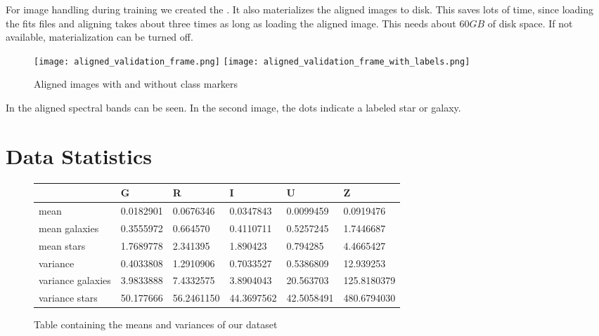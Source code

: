 For image handling during training we created the . It also materializes the aligned images to disk. This saves lots of time, since loading the fits files and aligning takes about three times as long as loading the aligned image. This needs about $60GB$ of disk space. If not available, materialization can be turned off.

\begin{figure}
    \texttt{[image: aligned\_validation\_frame.png]}
    \texttt{[image: aligned\_validation\_frame\_with\_labels.png]}
    \caption{Aligned images with and without class markers}
    \label{alignedImages}
\end{figure}

In  the aligned spectral bands can be seen. In the second image, the dots indicate a labeled star or galaxy.

\section{Data Statistics}
\begin{figure}
    \begin{table}[H]
        \begin{tabularx}{\textwidth}{mmmmmm}
            \hline
                              & G         & R          & I          & U          & Z           \\
            \hline
            mean              & 0.0182901 & 0.0676346  & 0.0347843  & 0.0099459  & 0.0919476   \\
            \hline
            mean galaxies     & 0.3555972 & 0.664570   & 0.4110711  & 0.5257245  & 1.7446687   \\
            \hline
            mean stars        & 1.7689778 & 2.341395   & 1.890423   & 0.794285   & 4.4665427   \\
            \hline
            variance          & 0.4033808 & 1.2910906  & 0.7033527  & 0.5386809  & 12.939253   \\
            \hline
            variance galaxies & 3.9833888 & 7.4332575  & 3.8904043  & 20.563703  & 125.8180379 \\
            \hline
            variance stars    & 50.177666 & 56.2461150 & 44.3697562 & 42.5058491 & 480.6794030 \\
            \hline
        \end{tabularx}
    \end{table}
    \caption{Table containing the means and variances of our dataset}
    \label{moments}
\end{figure}


